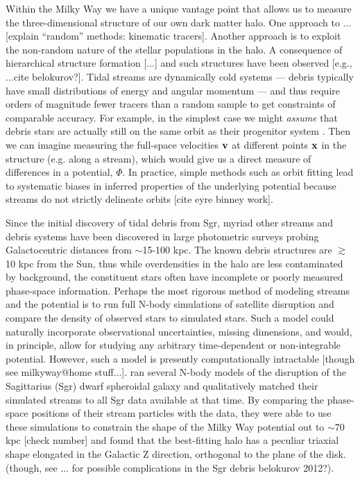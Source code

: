 \documentclass[letterpaper,12pt,preprint]{aastex}
\begin{document}
Within the Milky Way we have a unique vantage point that allows us to measure the three-dimensional structure of our own dark matter halo. One approach to ... [explain ``random'' methods: kinematic tracers]. Another approach is to exploit the non-random nature of the stellar populations in the halo. A consequence of hierarchical structure formation [...] and such structures have been observed [e.g., ...cite belokurov?]. Tidal streams are dynamically cold systems --- debris typically have small distributions of energy and angular momentum --- and thus require orders of magnitude fewer tracers than a random sample to get constraints of comparable accuracy. For example, in the simplest case we might {\it assume} that debris stars are actually still on the same orbit as their progenitor system \citep[a \emph{wrong} assumption, see e.g.][]{eyre}. Then we can imagine measuring the full-space velocities ${\bf v}$ at different points ${\bf x}$ in the structure (e.g. along a stream), which would give us a direct measure of differences in a potential, $\Phi$. In practice, simple methods such as orbit fitting lead to systematic biases in inferred properties of the underlying potential because streams do not strictly delineate orbits [cite eyre binney work]. 

Since the initial discovery of tidal debris from Sgr, myriad other streams and debris systems have been discovered in large photometric surveys probing Galactocentric distances from $\sim$15-100 kpc. The known debris structures are $\gtrsim$10 kpc from the Sun, thus while overdensities in the halo are less contaminated by background, the constituent stars often have incomplete or poorly measured phase-space information. Perhaps the most rigorous method of modeling streams and the potential is to run full N-body simulations of satellite disruption and compare the density of observed stars to simulated stars. Such a model could naturally incorporate observational uncertainties, missing dimensions, and would, in principle, allow for studying any arbitrary time-dependent or non-integrable potential. However, such a model is presently computationally intractable [though see milkyway@home stuff...]. \cite{law10} ran several N-body models of the disruption of the Sagittarius (Sgr) dwarf spheroidal galaxy and qualitatively matched their simulated streams to all Sgr data available at that time. By comparing the phase-space positions of their stream particles with the data, they were able to use these simulations to constrain the shape of the Milky Way potential out to $\sim$70 kpc [check number] and found that the best-fitting halo has a peculiar triaxial shape elongated in the Galactic Z direction, orthogonal to the plane of the disk. (though, see ... for possible complications in the Sgr debris belokurov 2012?). 
\end{document}
